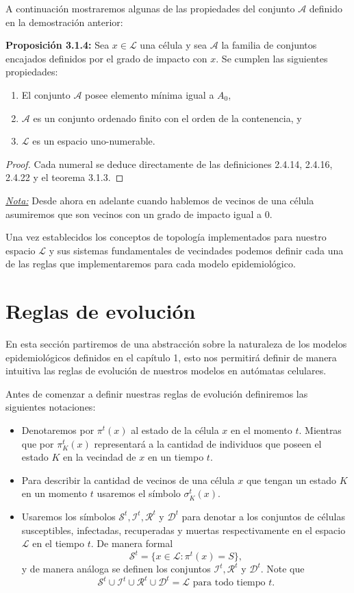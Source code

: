 A continuación mostraremos algunas de las propiedades del conjunto $\mathcal{A}$ definido en la demostración anterior:

\textbf{Proposición 3.1.4:} Sea $x\in\mathcal{L}$ una célula y sea $\mathcal{A}$ la familia de conjuntos encajados definidos por el grado de impacto con $x$. Se cumplen las siguientes propiedades:

\begin{enumerate}
    \item El conjunto $\mathcal{A}$ posee elemento mínima igual a $A_0$,
    \item $\mathcal{A}$ es un conjunto ordenado finito con el orden de la contenencia, y
    \item $\mathcal{L}$ es un espacio uno-numerable.
\end{enumerate}

\begin{proof}
Cada numeral se deduce directamente de las definiciones 2.4.14, 2.4.16, 2.4.22 y el teorema 3.1.3.
\end{proof}

\underline{\textit{Nota:}} Desde ahora en adelante cuando hablemos de vecinos de una célula asumiremos que son vecinos con un grado de impacto igual a 0.

Una vez establecidos los conceptos de topología implementados para nuestro espacio $\mathcal{L}$ y sus sistemas fundamentales de vecindades podemos definir cada una de las reglas que implementaremos para cada modelo epidemiológico.

\section{Reglas de evolución}

En esta sección partiremos de una abstracción sobre la naturaleza de los modelos epidemiológicos definidos en el capítulo 1, esto nos permitirá definir de manera intuitiva las reglas de evolución de nuestros modelos en autómatas celulares.

Antes de comenzar a definir nuestras reglas de evolución definiremos las siguientes notaciones:
\begin{itemize}
    \item Denotaremos por $\pi^t(x)$ al estado de la célula $x$ en el momento $t$. Mientras que por $\pi_K^t(x)$ representará a la cantidad de individuos que poseen el estado $K$ en la vecindad de $x$ en un tiempo $t$.
    \item Para describir la cantidad de vecinos de una célula $x$ que tengan un estado $K$ en un momento $t$ usaremos el símbolo $\sigma_K^t(x)$.
    \item Usaremos los símbolos $\mathcal{S}^t,\mathcal{I}^t,\mathcal{R}^t$ y $\mathcal{D}^t$ para denotar a los conjuntos de células susceptibles, infectadas, recuperadas y muertas respectivamente en el espacio $\mathcal{L}$ en el tiempo $t$. De manera formal
    $$\mathcal{S}^t=\{x\in\mathcal{L}:\pi^t(x)=S\},$$
    y de manera análoga se definen los conjuntos $\mathcal{I}^t,\mathcal{R}^t$ y $\mathcal{D}^t$. Note que $$\mathcal{S}^t\cup\mathcal{I}^t\cup\mathcal{R}^t\cup\mathcal{D}^t=\mathcal{L}\text{ para todo tiempo }t.$$
\end{itemize}

